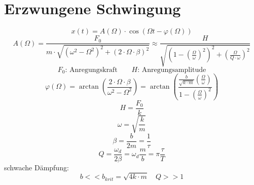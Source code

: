 
\begin{comment}
Differentialgleichung: 
\[ \boxed{F = m \cdot \ddot{x} + \underbrace{b \cdot \dot{x}}_
{\text{Dämpfung}} + k \cdot x = 0} \]
\[ \boxed{F_{\text{Dämpfung}} = F_{\text{Stokes}} 
= 6 \pi \cdot \eta \cdot R \cdot v} \]
\[ \boxed{\rightarrow b = 6 \pi \cdot \eta \cdot R} \]
\[ \boxed{\omega = \sqrt{\frac{k}{m}}} \]
\[ \boxed{\beta = \frac{b}{2 m}} \]
Fall 1: $\beta > \omega$ "'Kriechfall"'
\[ \boxed{x(t) \sim e^{(-\beta \pm \delta)t}} \]
Fall 2: $\beta = \omega$ "'kritische Dämpfung"'
\[ \boxed{b = b_{krit} = \sqrt{4 \cdot k \cdot m}} \]
Fall 3: $\beta < \omega$ "'Gedämpfte Schwingung"'
\[ \boxed{x(t) = A \cdot e^{-\beta t} \cdot \cos(\omega_d \cdot t)} \]
\[ \boxed{\omega_d = \sqrt{\omega^2 - \beta^2} 
= \sqrt{\frac{k}{m} - \left({\frac{b}{2 \cdot m}}\right)^2}} \]
Zerfallszeit: 
\[ \boxed{\tau = \frac{1}{\beta}} \]
\[ \boxed{A(t) = A_0 \cdot e^{-\beta t} = A_0 \cdot e^{-\frac{t}{\tau}}} \]
Bei der Zeit $t = \tau$
\[ \boxed{A(\tau) = \frac{A_0}{e} = A_0 \cdot e^{-1} \approx 0.37 \cdot A_0} \]
Abklingkonstante: 
\[ \boxed{\beta 
= \frac{\ln\left(\frac{x(t_1)}{x(t_2)}\right)}{t_2 - t_1}} \]
Schwingungsenergie: 
\[ \boxed{E(t) = \frac{m}{2} \cdot \dot{x}^2(t) + \frac{k}{2} \cdot x^2(t)} \]
Mittlere Energie: 
\[ \boxed{\langle E(t)\rangle = E_0 \cdot e^{-\frac{2 \cdot t}{\tau}}} \]
Güte: 
\[ \begin{array}{l}
\boxed{Q = \frac{2 \pi \cdot E(t)}{|\Delta E(t)|} 
= \frac{\pi}{\beta \cdot T_d} = \frac{\pi \cdot \tau}{T_d} 
= \frac{\omega_d \cdot \tau}{2}} \\
\text{$\Delta E(t)$: Energieverlust pro Periode}
\end{array} \]
\end{comment}

\section{Erzwungene Schwingung}
\[ \boxed{x(t) = A(\Omega) \cdot \cos(\Omega t - \varphi(\Omega))} \]
\[ \boxed{A(\Omega) = \frac{F_0}{m \cdot 
\sqrt{(\omega^2 - \Omega^2)^2 + (2 \cdot \Omega \cdot \beta)^2}} 
\approx \frac{H}{\sqrt{\left(1 - \left(\frac{\Omega}{\omega}\right)^2\right)^2 
+ \left(\frac{\Omega}{Q \cdot \omega}\right)^2}}} \]  
\[ F_0\text{: Anregungskraft} \qquad H\text{: Anregungsamplitude} \]
\[ \boxed{\varphi(\Omega) = \arctan\left(\frac{2 \cdot \Omega \cdot \beta}
{{\omega}^2 - \Omega^2}\right) 
= \arctan{\left(\frac{\frac{b}{\sqrt{k \cdot m}} 
\left(\frac{\Omega}{\omega}\right)}
{1 - \left(\frac{\Omega}{\omega}\right)^2}\right)}} \]
\[ \boxed{H = \frac{F_0}{k}} \]
\[ \boxed{\omega = \sqrt{\frac{k}{m}}} \]
\[ \boxed{\beta = \frac{b}{2 m} = \frac{1}{\tau}} \]
\[ \boxed{Q = \frac{\omega_d}{2\beta} = \omega_d \frac{m}{b} 
= \pi \frac{\tau}{T}} \]
schwache Dämpfung: 
\[ \boxed{b << b_{krit} = \sqrt{4 k \cdot m} \quad Q >> 1} \]

